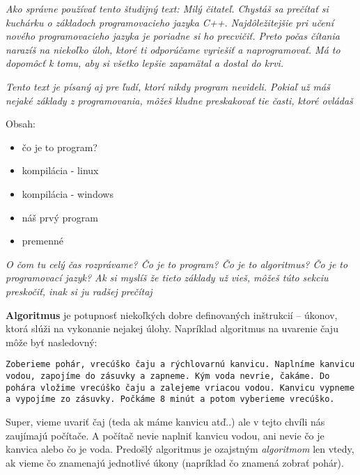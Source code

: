 




\textit{Ako správne používať tento študijný text: Milý čitateľ. Chystáš sa
prečítať si kuchárku o základoch programovacieho jazyka C++. Najdôležitejšie
pri učení nového programovacieho jazyka je poriadne si ho precvičiť. Preto
počas čítania narazíš na niekoľko úloh, ktoré ti odporúčame vyriešiť a
naprogramovať.  Má to dopomôcť k tomu, aby si všetko lepšie zapamätal a dostal
do krvi.}

\textit{Tento text je písaný aj pre ľudí, ktorí nikdy program nevideli. Pokiaľ
už máš nejaké základy z programovania, môžeš kludne preskakovať tie časti,
ktoré ovládaš}

Obsah:
\begin{itemize}
    \item čo je to program?
    \item kompilácia - linux
    \item kompilácia - windows %
    \item náš prvý program
    \item premenné
\end{itemize}

\medskip

 \textit{O čom tu celý čas rozprávame? Čo je to program? Čo
je to algoritmus? Čo je to programovací jazyk?  Ak si myslíš že tieto základy
už vieš, môžeš túto sekciu preskočiť, inak si ju radšej prečítaj}

\textbf{Algoritmus} je potupnosť niekoľkých dobre definovaných inštrukcií --
úkonov, ktorá slúži na vykonanie nejakej úlohy.  Napríklad algoritmus na
uvarenie čaju môže byť nasledovný:

\texttt{Zoberieme pohár, vrecúško čaju a rýchlovarnú kanvicu. Naplníme kanvicu
vodou, zapojíme do zásuvky a zapneme. Kým voda nevrie, čakáme.  Do pohára
vložime vrecúško čaju a zalejeme vriacou vodou. Kanvicu vypneme a vypojíme zo
zásuvky. Počkáme 8 minút a potom vyberieme vrecúško.}

Super, vieme uvariť čaj (teda ak máme kanvicu atď..) ale v tejto chvíli nás
zaujímajú počítače. A počítač nevie naplniť kanvicu vodou, ani nevie čo je
kanvica alebo čo je voda. Predošlý algoritmus je ozajstným \emph{algoritmom}
len vtedy, ak vieme čo znamenajú jednotlivé úkony (napríklad čo znamená zobrať
pohár). 

